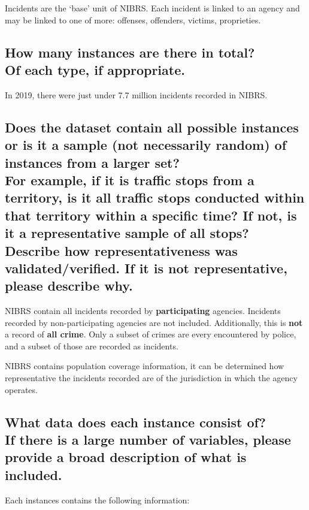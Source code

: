 \documentclass[letterpaper, 10 pt, conference]{ieeeconf}  %
\newcommand{\subtitle}[1]{{\\ \small \normalfont \color{purple} #1}}
\begin{document}
Incidents are the `base' unit of NIBRS. Each incident is linked to an agency and may be linked to one of more: offenses, offenders, victims, proprieties.

\subsection{How many instances are there in total? \subtitle{Of each type, if appropriate.}}

In 2019, there were just under 7.7 million incidents recorded in NIBRS. 


\subsection{Does the dataset contain all possible instances or is it a sample (not necessarily random) of instances from a larger set? \subtitle{For example, if it is traffic stops from a territory, is it all traffic stops conducted within that territory within a specific time? If not, is it a representative sample of all stops? Describe how representativeness was validated/verified. If it is not representative, please describe why.}}

NIBRS contain all incidents recorded by \textbf{participating} agencies. Incidents recorded by non-participating agencies are not included. Additionally, this is \textbf{not} a record of \textbf{all crime}. Only a subset of crimes are every encountered by police, and a subset of those are recorded as incidents. 

NIBRS contains population coverage information, it can be determined how representative the incidents recorded are of the jurisdiction in which the agency operates.

\subsection{What data does each instance consist of? \subtitle{If there is a large number of variables, please provide a broad description of what is included.}}

Each instances contains the following information: 
\end{document}
